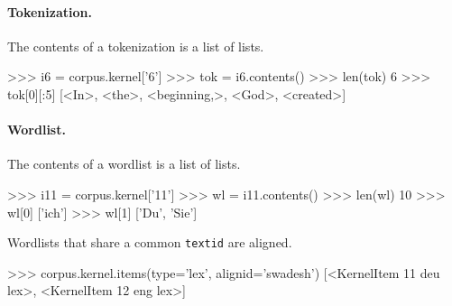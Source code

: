 \paragraph{Tokenization.}
The contents of a tokenization is a list of lists.
\begin{python}
>>> i6 = corpus.kernel['6']
>>> tok = i6.contents()
>>> len(tok)
6
>>> tok[0][:5]
[<In>, <the>, <beginning,>, <God>, <created>]
\end{python}

\paragraph{Wordlist.}
The contents of a wordlist is a list of lists.
\begin{python}
>>> i11 = corpus.kernel['11']
>>> wl = i11.contents()
>>> len(wl)
10
>>> wl[0]
['ich']
>>> wl[1]
['Du', 'Sie']
\end{python}
Wordlists that share a common {\tt textid} are aligned.
\begin{python}
>>> corpus.kernel.items(type='lex', alignid='swadesh')
[<KernelItem 11 deu lex>, <KernelItem 12 eng lex>]
\end{python}

